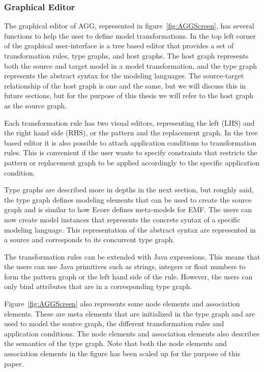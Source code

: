 \subsubsection*{Graphical Editor}
The graphical editor of AGG, represented in figure~\ref{fig:AGGScreen}, has
several functions to help the user to define model transformations. In the top
left corner of the graphical user-interface is a tree based editor that provides
a set of transformation rules, type graphs, and host graphs. The host graph
represents both the source and target model in a model transformation, and the
type graph represents the abstract syntax for the modeling languages. The
source-target relationship of the host graph is one and the same, but we will
discuss this in future sections, but for the purpose of this thesis we will
refer to the host graph as the source graph.

Each transformation rule has two visual editors, representing the left
(LHS) and the right hand side (RHS), or the pattern and the replacement graph.
In the tree based editor it is also possible to attach application conditions to
transformation rules. This is convenient if the user wants to specify
constraints that restricts the pattern or replacement graph to be applied
accordingly to the specific application condition.

Type graphs are described more in depths in the next section, but roughly said,
the type graph defines modeling elements that can be used to create the source
graph and is similar to how Ecore defines meta-models for EMF. The users can
now create model instances that represents the concrete syntax of a specific
modeling language. This representation of the abstract syntax are represented
in a source and corresponds to its concurrent type graph.

The transformation rules can be extended with Java expressions. This means that
the users can use Java primitives such as strings, integers or float numbers to
form the pattern graph or the left hand side of the rule. However, the users
can only bind attributes that are in a corresponding type graph.

Figure~\ref{fig:AGGScreen} also represents some node elements and association
elements. These are meta elements that are initialized in the type graph and
are used to model the source graph, the different transformation rules and
application conditions. The node elements and association elements also
describes the semantics of the type graph. Note that both the node elements and
association elements in the figure has been scaled up for the purpose of this
paper.

